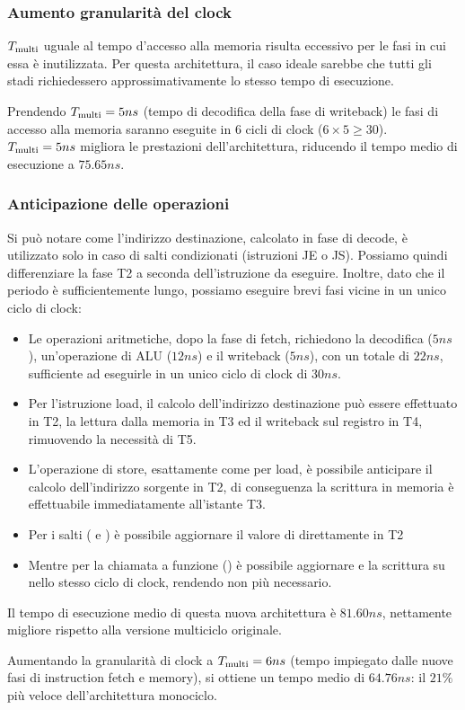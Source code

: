 \documentclass[../ace.tex]{subfiles}
\begin{document}
\subsubsection{Aumento granularità del clock}
$T_\text{multi}$ uguale al tempo d'accesso alla memoria risulta eccessivo per le fasi in cui essa è inutilizzata.
Per questa architettura, il caso ideale sarebbe che tutti gli stadi richiedessero approssimativamente lo stesso tempo di esecuzione.

Prendendo $T_\text{multi} = 5ns$ (tempo di decodifica della fase di writeback) le fasi di accesso alla memoria saranno eseguite in 6 cicli di clock ($6 \times 5 \ge 30$).
$T_\text{multi} = 5ns$ migliora le prestazioni dell'architettura, riducendo il tempo medio di esecuzione a $75.65ns$.

\subsubsection{Anticipazione delle operazioni}
Si può notare come l'indirizzo destinazione, calcolato in fase di decode, è utilizzato solo in caso di salti condizionati (istruzioni JE o JS).
Possiamo quindi differenziare la fase T2 a seconda dell'istruzione da eseguire.
Inoltre, dato che il periodo è sufficientemente lungo, possiamo eseguire brevi fasi vicine in un unico ciclo di clock:

\begin{itemize}
    \item
        Le operazioni aritmetiche, dopo la fase di fetch, richiedono la decodifica ($5ns$), un'operazione di ALU ($12ns$) e il writeback ($5ns$), con un totale di $22ns$, sufficiente ad eseguirle in un unico ciclo di clock di $30ns$.
    \item Per l'istruzione load, il calcolo dell'indirizzo destinazione può essere effettuato in T2, la lettura dalla memoria in T3 ed il writeback sul registro in T4, rimuovendo la necessità di T5.
    \item L'operazione di store, esattamente come per load, è possibile anticipare il calcolo dell'indirizzo sorgente in T2, di conseguenza la scrittura in memoria è effettuabile immediatamente all'istante T3.
    \item Per i salti ( e ) è possibile aggiornare il valore di  direttamente in T2
    \item Mentre per la chiamata a funzione () è possibile aggiornare  e la scrittura su  nello stesso ciclo di clock, rendendo  non più necessario.
\end{itemize}

Il tempo di esecuzione medio di questa nuova architettura è $81.60ns$, nettamente migliore rispetto alla versione multiciclo originale.

Aumentando la granularità di clock a $T_\text{multi}=6 ns$ (tempo impiegato dalle nuove fasi di instruction fetch e memory), si ottiene un tempo medio di $64.76ns$: il $21\%$ più veloce dell'architettura monociclo.
\end{document}
